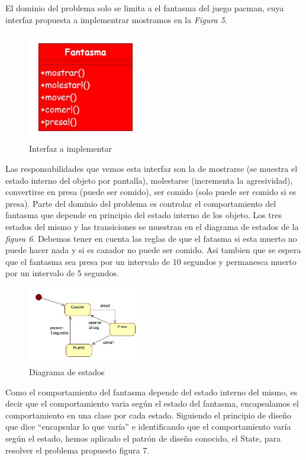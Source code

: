 \documentclass{article}
\begin{document}
\par
El dominio del problema solo se limita a el fantasma del juego pacman, cuya interfaz propuesta a implementrar mostramos en la  \textit{Figura 5}.

\begin{figure}[h]
	\centering
	\includegraphics[width=0.45\textwidth]{images/ejemplo/Interfaz.jpg}
	\caption{Interfaz a implementar}
\end{figure}

\par
Las responsabilidades que vemos esta interfaz son la de mostrarse (se muestra el estado interno del objeto por pantalla), molestarse (incrementa la agresividad), convertirse en presa (puede ser comido), ser comido (solo puede ser comido si es presa).
Parte del dominio del problema es controlar el comportamiento del fantasma que depende en principio del estado interno de los objeto. Los tres estados del mismo y las transiciones se muestran en el diagrama de estados de la  \textit{figura 6}. Debemos tener en cuenta las reglas de que el fatasma si esta muerto no puede hacer nada y si es cazador no puede ser comido. Asi tambien que se espera que el fantasma sea presa por un intervalo de 10 segundos y permanesca muerto por un intervalo de 5 segundos.

\begin{figure}[h]
	\centering
	\includegraphics[width=0.45\textwidth]{images/ejemplo/Estados.jpg}
	\caption{Diagrama de estados}
\end{figure}


Como el comportamiento del fantasma depende del estado interno del mismo, es decir que el comportamiento varia según el estado del fantasma, encapsulamos el comportamiento en una clase por cada estado. Siguiendo el principio de diseño que dice “encapsular lo que varía” e identificando que el comportamiento varía según el estado, hemos aplicado el patrón de diseño conocido, el State, para resolver el problema propuesto figura 7.
\end{document}
